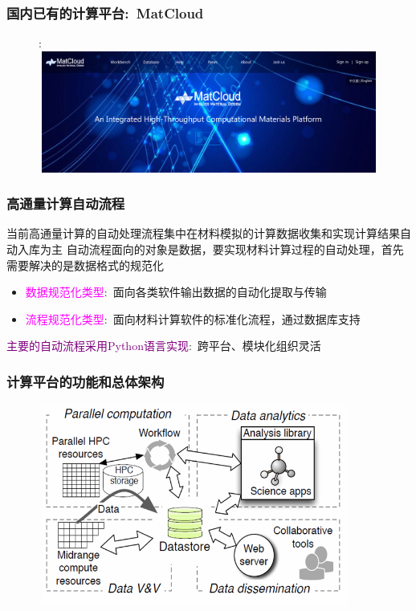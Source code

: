 \frame
{
	\frametitle{国内已有的计算平台:~\textrm{MatCloud}}
\begin{figure}[h!]:
\centering
\includegraphics[height=1.57in,width=4.95in,viewport=0 0 1800 550,clip]{Figures/Matcloud-login.png}
\caption{\fontsize{7.2pt}{4.2pt}\selectfont{中科院计算机网络信息中心~杨小渝团队开发}}%
\label{Auto_Flow_Platform-2}
\end{figure}
}

\frame
{
	\frametitle{高通量计算自动流程} 
当前高通量计算的自动处理流程集中在材料模拟的计算数据收集和实现计算结果自动入库为主
\vskip 2pt
{\fontsize{7.5pt}{4.2pt}\selectfont{材料第一原理计算的软件有很多，输出文件的格式千差万别，通过第一原理计算构建相对完善的材料数据库需要耗费相当的计算资源和人力}}
\vskip 5pt
自动流程面向的对象是数据，要实现材料计算过程的自动处理，首先需要解决的是数据格式的规范化
\begin{itemize}
	\item \textcolor{magenta}{数据规范化类型}:~面向各类软件输出数据的自动化提取与传输
\vskip 2pt
{\fontsize{6.5pt}{4.2pt}}
\item \textcolor{magenta}{流程规范化类型}:~面向材料计算软件的标准化流程，通过数据库支持 
\vskip 2pt
{\fontsize{6.5pt}{4.2pt}}
\end{itemize}
\textcolor{purple}{主要的自动流程采用\textrm{Python}语言实现}:~跨平台、模块化组织灵活
}

\frame
{
	\frametitle{计算平台的功能和总体架构}
\begin{figure}[h!]
\centering
\vspace*{-0.35in}
\includegraphics[height=2.6in,width=4.05in,viewport=0 0 670 460,clip]{Figures/Parallel_computation.png}
\caption{\fontsize{7.2pt}{4.2pt}}%
\label{Auto_Flow}
\end{figure} 
}

